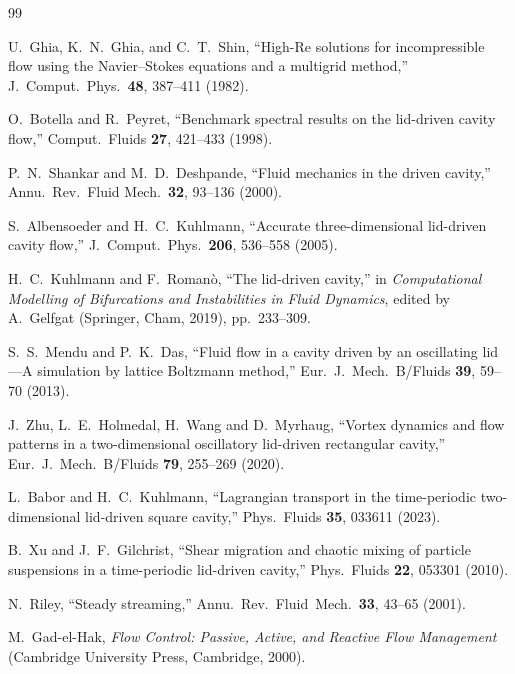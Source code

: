 \documentclass[11pt,a4paper]{article}
\begin{document}
\begin{thebibliography}{99}

U.~Ghia, K.~N.~Ghia, and C.~T.~Shin,
``High-Re solutions for incompressible flow using the Navier--Stokes equations and
a multigrid method,'' J.\ Comput.\ Phys.\ \textbf{48}, 387--411 (1982).

O.~Botella and R.~Peyret,
``Benchmark spectral results on the lid-driven cavity flow,''
Comput.\ Fluids \textbf{27}, 421--433 (1998).

P.~N.~Shankar and M.~D.~Deshpande,
``Fluid mechanics in the driven cavity,''
Annu.\ Rev.\ Fluid Mech.\ \textbf{32}, 93--136 (2000).

S.~Albensoeder and H.~C.~Kuhlmann,
``Accurate three-dimensional lid-driven cavity flow,''
J.\ Comput.\ Phys.\ \textbf{206}, 536--558 (2005).

H.~C.~Kuhlmann and F.~Roman\`o,
``The lid-driven cavity,'' in \textit{Computational Modelling of Bifurcations and
Instabilities in Fluid Dynamics}, edited by A.~Gelfgat (Springer, Cham, 2019),
pp.~233--309.

S.~S.~Mendu and P.~K.~Das,
``Fluid flow in a cavity driven by an oscillating lid---A simulation by lattice
Boltzmann method,''
Eur.\ J.\ Mech.\ B/Fluids \textbf{39}, 59--70 (2013).

J.~Zhu, L.~E.~Holmedal, H.~Wang and D.~Myrhaug,
``Vortex dynamics and flow patterns in a two-dimensional oscillatory lid-driven
rectangular cavity,''
Eur.\ J.\ Mech.\ B/Fluids \textbf{79}, 255--269 (2020).

L.~Babor and H.~C.~Kuhlmann,
``Lagrangian transport in the time-periodic two-dimensional lid-driven square
cavity,''
Phys.\ Fluids \textbf{35}, 033611 (2023).

B.~Xu and J.~F.~Gilchrist,
``Shear migration and chaotic mixing of particle suspensions in a time-periodic
lid-driven cavity,''
Phys.\ Fluids \textbf{22}, 053301 (2010).

N.~Riley,
``Steady streaming,''
Annu.\ Rev.\ Fluid\ Mech.\ \textbf{33}, 43--65 (2001).

M.~Gad-el-Hak,
\textit{Flow Control: Passive, Active, and Reactive Flow Management}
(Cambridge University Press, Cambridge, 2000).


\end{thebibliography}
\end{document}
